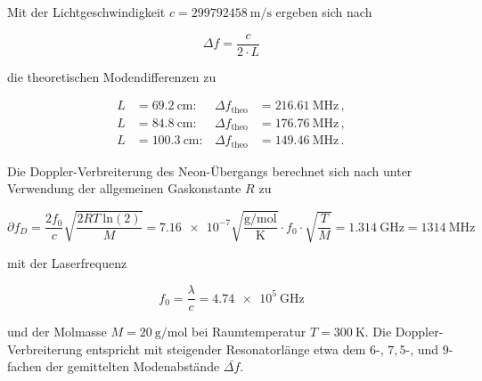 Mit der Lichtgeschwindigkeit $c = \SI{299 792 458}{\meter\per\second}$ ergeben sich nach  

\vspace{-5pt}
\begin{equation}
    \Delta f = \frac{c}{2 \cdot L}
\end{equation}

die theoretischen Modendifferenzen zu

\vspace{-15pt}
\begin{align*}
    L &= \SI{ 69.2}{\centi\meter}: & \Delta f_\text{theo} &= \SI{216.61}{\mega\hertz}\, , \\  
    L &= \SI{ 84.8}{\centi\meter}: & \Delta f_\text{theo} &= \SI{176.76}{\mega\hertz}\, , \\  
    L &= \SI{100.3}{\centi\meter}: & \Delta f_\text{theo} &= \SI{149.46}{\mega\hertz}\, .  
\end{align*}

Die Doppler-Verbreiterung des Neon-Übergangs berechnet sich nach \cite[S.49]{spektro}
unter Verwendung der allgemeinen Gaskonstante $R$ zu

\vspace{-5pt}
\begin{equation}
    \partial f_D = \frac{2f_0}{c} \sqrt{\frac{2RT\: \text{ln}(2)}{M}} 
    = \num{7.16e-7}\sqrt{\frac{\si{\gram\per\mol}}{\si{\kelvin}}} \cdot f_0 \cdot \sqrt{\frac{T}{M}}
    = \SI{1.314}{\giga\hertz} = \SI{1314}{\mega\hertz}
\end{equation}

mit der Laserfrequenz 

\vspace{-5pt}
\begin{equation}
    f_0 = \frac{\lambda}{c} = \SI{4.74e5}{\giga\hertz}
\end{equation}

und der Molmasse
$M = \SI{20}{\gram\per\mol}$ bei Raumtemperatur $T = \SI{300}{\kelvin}$.
Die Doppler-Verbreiterung entspricht mit steigender Resonatorlänge etwa dem $6$-, $7,5$-, und $9$-fachen der 
gemittelten Modenabstände $\bar{\Delta f}$.

